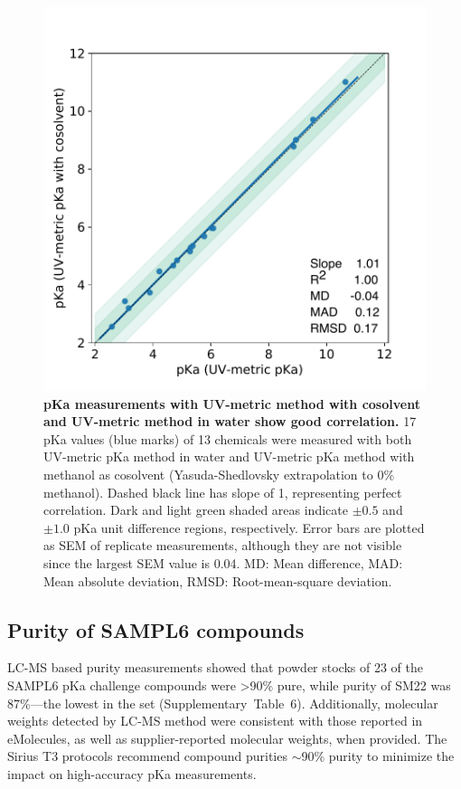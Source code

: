 \documentclass[9pt,lineno]{elife}
\begin{document}
\begin{figure}
\begin{center}
\includegraphics[width=0.5\linewidth]{figures/water_vs_cosolvent_pKa_values_correlation_figure.pdf}
\caption{{\bf pKa measurements with UV-metric method with cosolvent and UV-metric method in water show good correlation.} 
17 pKa values (blue marks) of 13 chemicals were measured with both UV-metric pKa method in water and UV-metric pKa method with methanol as cosolvent (Yasuda-Shedlovsky extrapolation to 0\% methanol). Dashed black line has slope of 1, representing perfect correlation.  Dark and light green shaded areas indicate $\pm 0.5$ and $\pm 1.0$ pKa unit difference regions, respectively. Error bars are plotted as SEM of replicate measurements, although they are not visible since the largest SEM value is 0.04. MD: Mean difference, MAD: Mean absolute deviation, RMSD: Root-mean-square deviation.  
}
\label{fig:water_vs_cosolvent_pKa_correlation}
\end{center}
\end{figure}

\subsection{Purity of SAMPL6 compounds}
LC-MS based purity measurements showed that powder stocks of 23 of the SAMPL6 pKa challenge compounds were >90\% pure, while purity of SM22 was 87\%---the lowest in the set (Supplementary~Table~6).  
Additionally, molecular weights detected by LC-MS method were consistent with those reported in eMolecules, as well as supplier-reported molecular weights, when provided. 
The Sirius T3 protocols recommend compound purities $\sim$90\% purity to minimize the impact on high-accuracy pKa measurements. 
\end{document}
